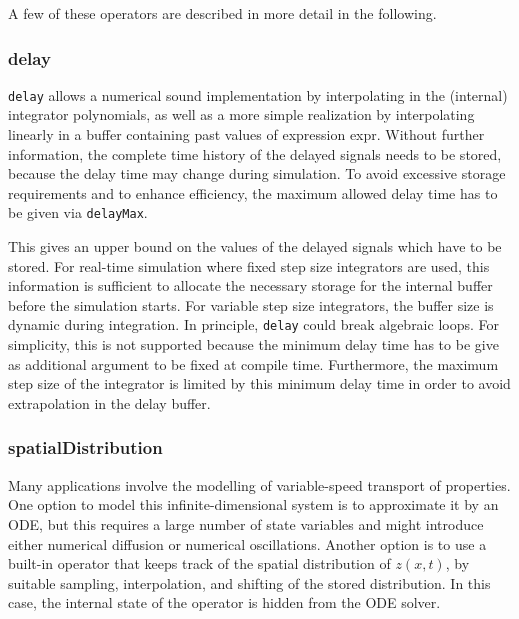 A few of these operators are described in more detail in the following.

\subsubsection{delay}\label{delay}

\begin{nonnormative}
\lstinline!delay! allows a numerical sound
implementation by interpolating in the (internal) integrator
polynomials, as well as a more simple realization by interpolating
linearly in a buffer containing past values of expression expr. Without
further information, the complete time history of the delayed signals
needs to be stored, because the delay time may change during simulation.
To avoid excessive storage requirements and to enhance efficiency, the
maximum allowed delay time has to be given via \lstinline!delayMax!.

This gives an upper bound on the values of the delayed signals
which have to be stored. For real-time simulation where fixed step size
integrators are used, this information is sufficient to allocate the
necessary storage for the internal buffer before the simulation starts.
For variable step size integrators, the buffer size is dynamic during
integration. In principle, \lstinline!delay! could break algebraic
loops. For simplicity, this is not supported because the minimum delay
time has to be give as additional argument to be fixed at compile time.
Furthermore, the maximum step size of the integrator is limited by this
minimum delay time in order to avoid extrapolation in the delay
buffer.
\end{nonnormative}

\subsubsection{spatialDistribution}\label{spatialdistribution}

\begin{nonnormative}
Many applications involve the modelling of variable-speed
transport of properties. One option to model this infinite-dimensional
system is to approximate it by an ODE, but this requires a large number
of state variables and might introduce either numerical diffusion or
numerical oscillations. Another option is to use a built-in operator
that keeps track of the spatial distribution of $z(x, t)$, by suitable
sampling, interpolation, and shifting of the stored distribution. In
this case, the internal state of the operator is hidden from the ODE
solver.
\end{nonnormative}

